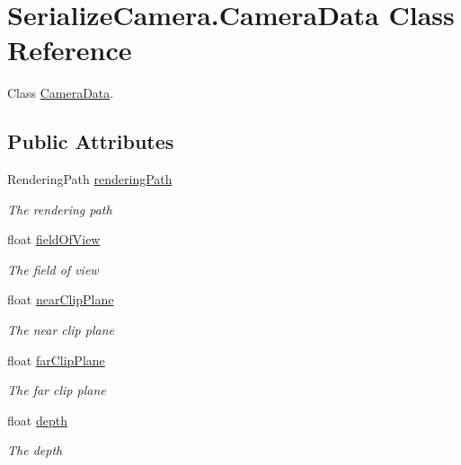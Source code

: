 \hypertarget{class_serialize_camera_1_1_camera_data}{}\section{Serialize\+Camera.\+Camera\+Data Class Reference}
\label{class_serialize_camera_1_1_camera_data}


Class \hyperlink{class_serialize_camera_1_1_camera_data}{Camera\+Data}.  


\subsection*{Public Attributes}
\begin{DoxyCompactItemize}
\item 
Rendering\+Path \hyperlink{class_serialize_camera_1_1_camera_data_acfeb7b1fdb6a04f4f350de588bf3d79c}{rendering\+Path}
\begin{DoxyCompactList}\small\item\em The rendering path \end{DoxyCompactList}\item 
float \hyperlink{class_serialize_camera_1_1_camera_data_a9811f76f15039e682cf6dd5afb1fde96}{field\+Of\+View}
\begin{DoxyCompactList}\small\item\em The field of view \end{DoxyCompactList}\item 
float \hyperlink{class_serialize_camera_1_1_camera_data_aa752f22384c985d27cd88bea7f66aa85}{near\+Clip\+Plane}
\begin{DoxyCompactList}\small\item\em The near clip plane \end{DoxyCompactList}\item 
float \hyperlink{class_serialize_camera_1_1_camera_data_a2579af1f7b6d436a9afcc7bf2d0f921a}{far\+Clip\+Plane}
\begin{DoxyCompactList}\small\item\em The far clip plane \end{DoxyCompactList}\item 
float \hyperlink{class_serialize_camera_1_1_camera_data_a17cf2413e805d8c7a2d2c52ee7539979}{depth}
\begin{DoxyCompactList}\small\item\em The depth \end{DoxyCompactList}\item 

\end{DoxyCompactItemize}
